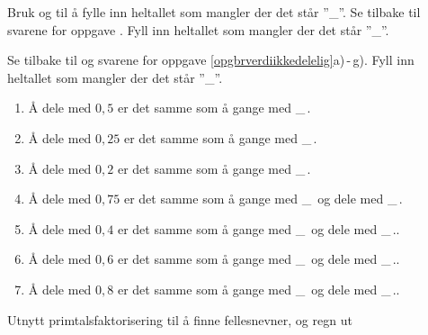 Bruk  og  til å fylle inn heltallet som mangler der det står ''\_''.
Se tilbake til svarene for oppgave . Fyll inn heltallet som mangler der det står ''\_''.

\newpage
{}
Se tilbake til  og svarene for oppgave \ref{opgbrverdiikkedelelig}a)\,-\,g).
Fyll inn heltallet som mangler der det står ''\_''.
{\renewcommand{\labelenumi}{(\alph{enumi})}
	\begin{enumerate}
		\item Å dele med $ 0,5 $ er det samme som å gange med \_\,.
		\item Å dele med $ 0,25 $ er det samme som å gange med \_\,.
		\item Å dele med $ 0,2 $ er det samme som å gange med \_\,.
		\item Å dele med $ 0,75 $ er det samme som å gange med \_\, og dele med \_\,.
		\item Å dele med $ 0,4 $ er det samme som å gange med \_\, og dele med \_\,..
		\item Å dele med $ 0,6 $ er det samme som å gange med \_\, og dele med \_\,..
		\item Å dele med $ 0,8 $ er det samme som å gange med \_\, og dele med \_\,..	
\end{enumerate} }

Utnytt primtalsfaktorisering til å finne fellesnevner, og regn ut\os
{}
\newpage



